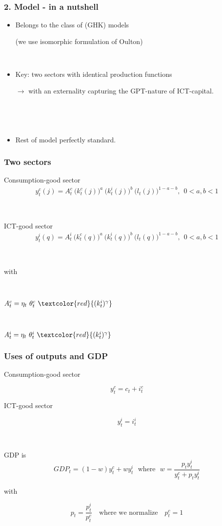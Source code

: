 \documentclass{beamer}
\begin{document}
\begin{frame}
	\frametitle{2. Model - in a nutshell}
	
	\begin{itemize}
	\item Belongs to the class of (GHK) models 
	
	(we use isomorphic formulation of Oulton)
	
	\
	
	\item Key: two sectors with identical production functions
	\item[$\rightarrow$] with an externality capturing the GPT-nature of ICT-capital.
	
	\
	
	\
	
	\item	Rest of model perfectly standard.
	\end{itemize}
	

\end{frame}

\begin{frame}
	\frametitle{Two sectors}

Consumption-good sector
\begin{eqnarray}\label{equation:production_FINAL}
y^c_t(j) = A^c_t \ \big( k^c_{t}(j) \big)^a \ \big( k^i_{t}(j) \big)^b \ \big( l_{t}(j) \big)^{1-a-b}, \ \ 0 < a,b < 1
\end{eqnarray}

\

ICT-good sector
\begin{eqnarray}\label{equation:productionICT}
y^i_t(q) = A_t^i \ \big( k^c_{t}(q) \big)^a \ \big( k^i_{t}(q) \big)^b \ \big( l_{t}(q) \big)^{1-a-b}, \ \ 0 < a,b < 1
\end{eqnarray}

\

with 

\

\centering
$ A_t^c = \eta_t \ \theta^c_t \ \textcolor{red}{(k^i_{t})^{\gamma}}  $

\

$A_t^i = \eta_t \ \theta^i_t \ \textcolor{red}{(k^i_{t})^{\gamma}} $	

\end{frame}

\begin{frame}
	\frametitle{Uses of outputs and GDP}

Consumption-good sector

$$
y^c_t = c_t + i^c_t
$$

ICT-good sector


$$
y^i_t = i^i_t
$$

\

GDP is 
$$
GDP_t = (1 - w) y^c_t+ w y^i_t \ \ \ \text{where} \ \ \ w = \frac{p_t y^i_t }{y^c_t + p_t y^i_t }
$$


with

$$
p_t = \frac{p_t^i}{p_t^c} \quad \text{where we normalize} \quad p_t^c = 1
$$



\end{frame}
\end{document}
